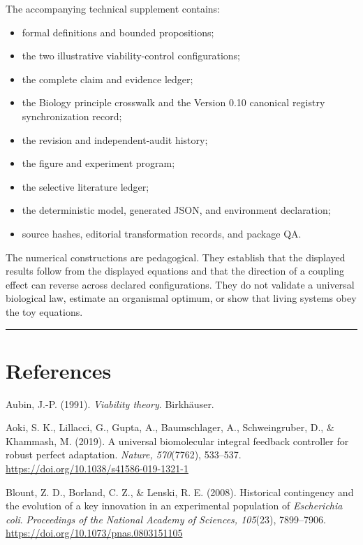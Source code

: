\documentclass[
  11pt,
]{article}
\providecommand{\tightlist}{%
  \setlength{\itemsep}{0pt}\setlength{\parskip}{0pt}}
\begin{document}
The accompanying technical supplement contains:

\begin{itemize}
\tightlist
\item
  formal definitions and bounded propositions;
\item
  the two illustrative viability-control configurations;
\item
  the complete claim and evidence ledger;
\item
  the Biology principle crosswalk and the Version 0.10 canonical
  registry synchronization record;
\item
  the revision and independent-audit history;
\item
  the figure and experiment program;
\item
  the selective literature ledger;
\item
  the deterministic model, generated JSON, and environment declaration;
\item
  source hashes, editorial transformation records, and package QA.
\end{itemize}

The numerical constructions are pedagogical. They establish that the
displayed results follow from the displayed equations and that the
direction of a coupling effect can reverse across declared
configurations. They do not validate a universal biological law,
estimate an organismal optimum, or show that living systems obey the toy
equations.

\begin{center}\rule{0.5\linewidth}{0.5pt}\end{center}

\section{References}\label{references}

Aubin, J.-P. (1991). \emph{Viability theory}. Birkhäuser.

Aoki, S. K., Lillacci, G., Gupta, A., Baumschlager, A., Schweingruber,
D., \& Khammash, M. (2019). A universal biomolecular integral feedback
controller for robust perfect adaptation. \emph{Nature, 570}(7762),
533--537. \url{https://doi.org/10.1038/s41586-019-1321-1}

Blount, Z. D., Borland, C. Z., \& Lenski, R. E. (2008). Historical
contingency and the evolution of a key innovation in an experimental
population of \emph{Escherichia coli}. \emph{Proceedings of the National
Academy of Sciences, 105}(23), 7899--7906.
\url{https://doi.org/10.1073/pnas.0803151105}
\end{document}
